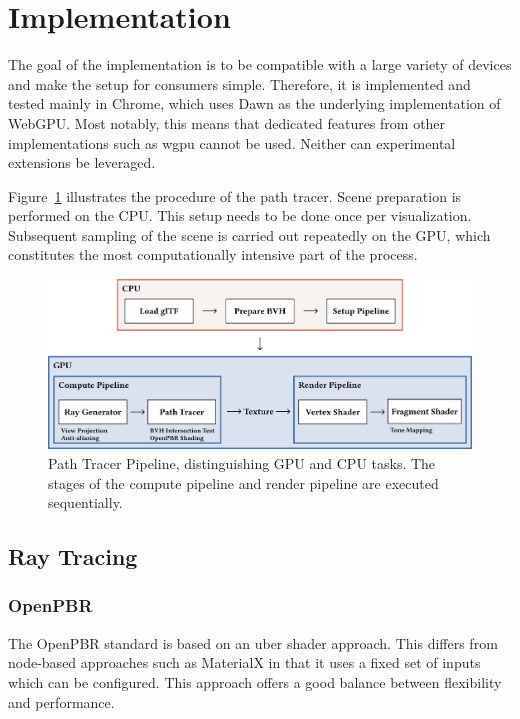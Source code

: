 \section{Implementation}

The goal of the implementation is to be compatible with a large variety of devices and make the setup for consumers simple. Therefore, it is implemented and tested mainly in Chrome, which uses \gls{Dawn} as the underlying implementation of WebGPU. Most notably, this means that dedicated features from other implementations such as \gls{wgpu} cannot be used. Neither can experimental extensions be leveraged.

Figure~\ref{fig:path-tracer} illustrates the procedure of the path tracer. Scene preparation is performed on the CPU. This setup needs to be done once per visualization. Subsequent sampling of the scene is carried out repeatedly on the GPU, which constitutes the most computationally intensive part of the process.

\begin{figure}[H]
    \includegraphics[width=1.0\columnwidth]{resources/path-tracer-pipeline.png}
    \caption{Path Tracer Pipeline, distinguishing GPU and CPU tasks. The stages of the compute pipeline and render pipeline are executed sequentially.}
    \label{fig:path-tracer}
\end{figure}

\subsection{Ray Tracing}

\subsubsection{OpenPBR}

The \gls{OpenPBR} standard is based on an \gls{uber shader} approach. This differs from node-based approaches such as \gls{MaterialX} in that it uses a fixed set of inputs which can be configured. This approach offers a good balance between flexibility and performance.

